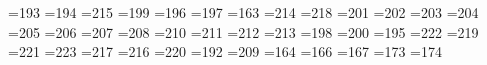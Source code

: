 =193 %
{}=194 %
{}=215 %
{}=199 %
{}=196 %
{}=197 %
{}=163 %
{}=214 %
{}=218 %
{}=201 %
{}=202 %
{}=203 %
{}=204 %
{}=205 %
{}=206 %
{}=207 %
{}=208 %
{}=210 %
{}=211 %
{}=212 %
{}=213 %
{}=198 %
{}=200 %
{}=195 %
{}=222 %
{}=219 %
{}=221 %
{}=223 %
{}=217 %
{}=216 %
{}=220 %
{}=192 %
{}=209 %
=164 %
{}=166 %
{}=167 %
{}=173 %
{}=174 %
